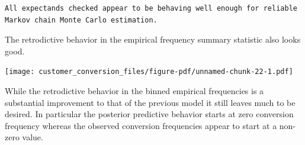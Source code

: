 \documentclass[
  letterpaper,
  DIV=11,
  numbers=noendperiod]{scrartcl}
\newenvironment{Shaded}{\begin{snugshade}}{\end{snugshade}}
\newcommand{\AttributeTok}[1]{\textcolor[rgb]{0.40,0.45,0.13}{#1}}
\newcommand{\DecValTok}[1]{\textcolor[rgb]{0.68,0.00,0.00}{#1}}
\newcommand{\FunctionTok}[1]{\textcolor[rgb]{0.28,0.35,0.67}{#1}}
\newcommand{\NormalTok}[1]{\textcolor[rgb]{0.00,0.23,0.31}{#1}}
\newcommand{\OtherTok}[1]{\textcolor[rgb]{0.00,0.23,0.31}{#1}}
\newcommand{\SpecialCharTok}[1]{\textcolor[rgb]{0.37,0.37,0.37}{#1}}
\newcommand{\StringTok}[1]{\textcolor[rgb]{0.13,0.47,0.30}{#1}}
\begin{document}
\begin{Shaded}
\end{Shaded}

\begin{verbatim}
All expectands checked appear to be behaving well enough for reliable
Markov chain Monte Carlo estimation.
\end{verbatim}

The retrodictive behavior in the empirical frequency summary statistic
also looks good.

\begin{Shaded}
\end{Shaded}

\texttt{[image: customer\_conversion\_files/figure-pdf/unnamed-chunk-22-1.pdf]}

While the retrodictive behavior in the binned empirical frequencies is a
substantial improvement to that of the previous model it still leaves
much to be desired. In particular the posterior predictive behavior
starts at zero conversion frequency whereas the observed conversion
frequencies appear to start at a non-zero value.
\end{document}
